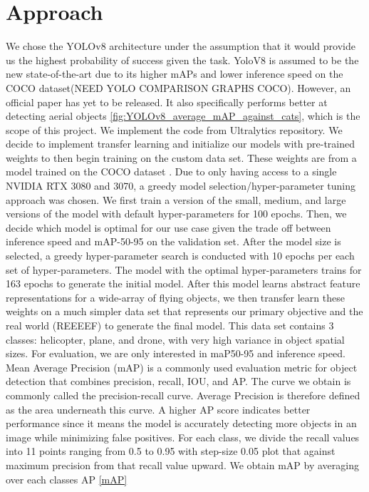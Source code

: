\documentclass[10pt,twocolumn,letterpaper]{article}
\begin{document}
\section{Approach}

We chose the YOLOv8 architecture under the assumption that it would provide us the highest probability of success given the task. YoloV8 is 
assumed to be the new state-of-the-art due to its higher mAPs and lower inference speed on the COCO dataset(NEED YOLO COMPARISON GRAPHS COCO). However, an official paper has 
yet to be released. It also specifically performs better at detecting aerial objects \ref{fig:YOLOv8_average_mAP_against_cats}, which is the scope of this project. We implement the code
from Ultralytics repository. We decide to implement transfer learning and initialize our models with pre-trained weights to then begin training on the 
custom data set. These weights are from a model trained on the COCO dataset \cite{coco}. Due to only having access to a single NVIDIA RTX 3080 and 3070, 
a greedy model selection/hyper-parameter tuning approach was chosen. We first train a version of the small, medium, and large versions of the 
model with default hyper-parameters for 100 epochs. Then, we decide which model is optimal for our use case given the trade off between inference 
speed and mAP-50-95 on the validation set. After the model size is selected, a greedy hyper-parameter search is conducted with 10 epochs per each 
set of hyper-parameters. The model with the optimal hyper-parameters trains for 163 epochs to generate the initial model. After this model learns abstract feature representations for a wide-array of flying objects, we then transfer learn these weights on a much simpler data set that represents our primary objective and the real world (REEEEF) to generate the final model. This data set contains 3 classes: helicopter, plane, and drone, with very high variance in object spatial sizes. For evaluation, we are only interested in maP50-95 and inference speed.
Mean Average Precision (mAP) is a commonly used evaluation metric for object detection that combines precision, recall, IOU, and AP. The curve we obtain is commonly called the precision-recall curve. Average Precision is therefore defined as the area underneath this curve. A higher AP score indicates better performance since it means the model is accurately detecting more objects in an image while minimizing false positives.
For each class, we divide the recall values into 11 points ranging from 0.5 to 0.95 with step-size 0.05 plot that against maximum precision from that recall value upward. We obtain mAP by averaging over each classes AP \ref{mAP}\\ 
\end{document}
